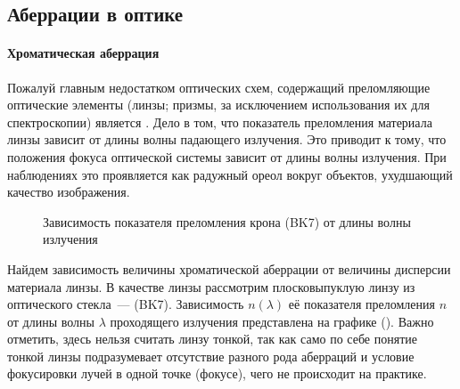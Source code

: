 \subsection{Аберрации в оптике}
\paragraph{Хроматическая аберрация}
Пожалуй главным недостатком оптических схем, содержащий преломляющие оптические элементы (линзы; призмы, за исключением использования их для спектроскопии) является . Дело в том, что показатель преломления материала линзы зависит от длины волны падающего излучения. Это приводит к тому, что положения фокуса оптической системы зависит от длины волны излучения. При наблюдениях это проявляется как радужный ореол вокруг объектов, ухудшающий качество изображения.

\begin{wrapfigure}{r}{0.5\tw}
    \centering
    \vspace{-1pc}
    \caption{Зависимость показателя преломления крона (BK7) от длины волны излучения}
    \label{pic:crown-dispersion}
\end{wrapfigure}
Найдем зависимость величины хроматической аберрации от величины дисперсии материала линзы. В качестве линзы рассмотрим плосковыпуклую линзу из оптического стекла~---  (BK7). Зависимость $n(\lambda)$ её показателя преломления $n$ от длины волны $\lambda$ проходящего излучения представлена на графике (). Важно отметить, здесь нельзя считать линзу тонкой, так как само по себе понятие тонкой линзы подразумевает отсутствие разного рода аберраций и условие фокусировки лучей в одной точке (фокусе), чего не происходит на практике.

